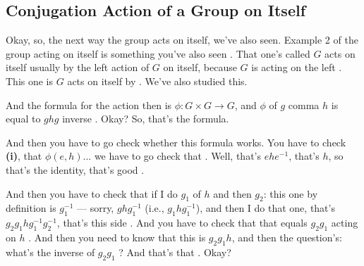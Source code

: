 \begin{hidden}
\end{hidden}

\subsection{Conjugation Action of a Group on Itself}

\begin{speech}[01:19:30 - 01:21:15]
Okay, so, the next way the group acts on itself, we've also seen. Example 2 of the group acting on itself is something you've also seen . That one's called $G$ acts on itself usually by the left action of $G$ on itself, because $G$ is acting on the left . This one is $G$ acts on itself by  . We've also studied this.

And the formula for the action then is $\phi \colon G \times G \to G$, and $\phi$ of $g$ comma $h$ is equal to $g h g$ inverse . Okay? So, that's the formula.

And then you have to go check whether this formula works. You have to check \textbf{(i)}, that $\phi(e, h)$... we have to go check that . Well, that's $e h e^{-1}$, that's $h$, so that's the identity, that's good .

And then you have to check that if I do $g_1$ of $h$ and then $g_2$: this one by definition is $g_1^{-1}$ --- sorry, $g h g_1^{-1}$ (i.e., $g_1 h g_1^{-1}$), and then I do that one, that's $g_2 g_1 h g_1^{-1} g_2^{-1}$, that's this side . And you have to check that that equals $g_2 g_1$ acting on $h$ . And then you need to know that this is $g_2 g_1 h$, and then the question's: what's the inverse of $g_2 g_1$ ? And that's that . Okay?
\end{speech}

